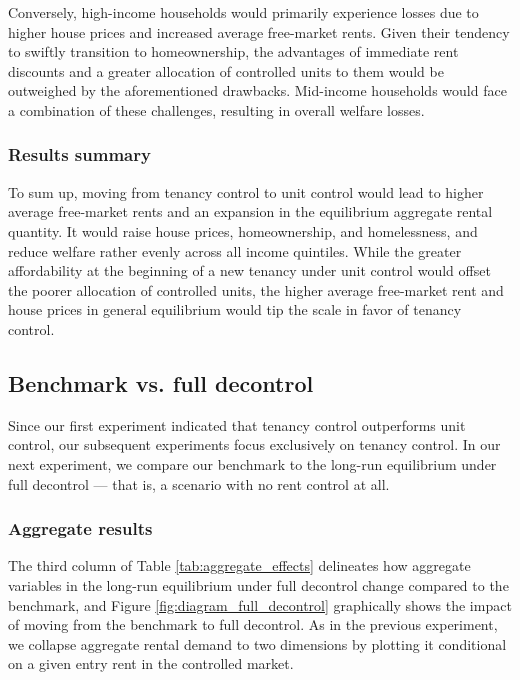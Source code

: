 \documentclass[parskip=full]{article}
\begin{document}
Conversely, high-income households would primarily experience losses due to higher house prices and increased average free-market rents. Given their tendency to swiftly transition to homeownership, the advantages of immediate rent discounts and a greater allocation of controlled units to them would be outweighed by the aforementioned drawbacks. Mid-income households would face a combination of these challenges, resulting in overall welfare losses.

\subsubsection{Results summary}

To sum up, moving from tenancy control to unit control would lead to higher average free-market rents and an expansion in the equilibrium aggregate rental quantity. It would raise house prices, homeownership, and homelessness, and reduce welfare rather evenly across all income quintiles. While the greater affordability at the beginning of a new tenancy under unit control would offset the poorer allocation of controlled units, the higher average free-market rent and house prices in general equilibrium would tip the scale in favor of tenancy control.

\subsection{Benchmark vs. full decontrol}

Since our first experiment indicated that tenancy control outperforms unit control, our subsequent experiments focus exclusively on tenancy control. In our next experiment, we compare our benchmark to the long-run equilibrium under full decontrol — that is, a scenario with no rent control at all.

\subsubsection{Aggregate results}

The third column of Table \ref{tab:aggregate_effects} delineates how aggregate variables in the long-run equilibrium under full decontrol change compared to the benchmark, and Figure \ref{fig:diagram_full_decontrol} graphically shows the impact of moving from the benchmark to full decontrol. As in the previous experiment, we collapse aggregate rental demand to two dimensions by plotting it conditional on a given entry rent in the controlled market.
\end{document}

